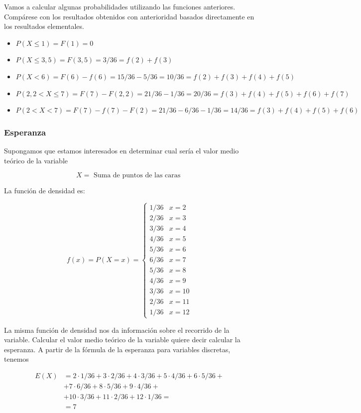 \documentclass[
]{article}
\providecommand{\tightlist}{%
  \setlength{\itemsep}{0pt}\setlength{\parskip}{0pt}}
\begin{document}
Vamos a calcular algunas probabilidades utilizando las funciones
anteriores. Compárese con los resultados obtenidos con anterioridad
basados directamente en los resultados elementales.

\begin{itemize}
\tightlist
\item
  \(P(X \leq 1)=F(1)=0\)
\item
  \(P(X \leq 3,5)=F(3,5)=3 / 36=f(2)+f(3)\)
\item
  \(P(X<6)=F(6)-f(6)=15 / 36-5 / 36=10 / 36=f(2)+f(3)+f(4)+f(5)\)
\item
  \(P(2,2<X \leq 7)=F(7)-F(2,2)=21 / 36-1 / 36=20 / 36=f(3)+f(4)+f(5)+f(6)+f(7)\)
\item
  \(P(2<X<7)=F(7)-f(7)-F(2)=21 / 36-6 / 36-1 / 36=14 / 36=f(3)+f(4)+f(5)+f(6)\)
\end{itemize}

\subsubsection{Esperanza}\label{esperanza}

Supongamos que estamos interesados en determinar cual sería el valor
medio teórico de la variable

\[
X=\text { Suma de puntos de las caras }
\]

La función de densidad es:

\[
f(x)=P(X=x)= \begin{cases}1 / 36 & x=2 \\ 2 / 36 & x=3 \\ 3 / 36 & x=4 \\ 4 / 36 & x=5 \\ 5 / 36 & x=6 \\ 6 / 36 & x=7 \\ 5 / 36 & x=8 \\ 4 / 36 & x=9 \\ 3 / 36 & x=10 \\ 2 / 36 & x=11 \\ 1 / 36 & x=12\end{cases}
\]

La misma función de densidad nos da información sobre el recorrido de la
variable. Calcular el valor medio teórico de la variable quiere decir
calcular la esperanza. A partir de la fórmula de la esperanza para
variables discretas, tenemos

\[
\begin{aligned}
E(X) &=2 \cdot 1 / 36+3 \cdot 2 / 36+4 \cdot 3 / 36+5 \cdot 4 / 36+6 \cdot 5 / 36+\\
& + 7 \cdot 6 / 36+8 \cdot 5 / 36+9 \cdot 4 / 36+\\
&+ 10 \cdot 3 / 36+ 
11 \cdot 2 / 36+12 \cdot 1 / 36=\\
& =7
\end{aligned}
\]
\end{document}
